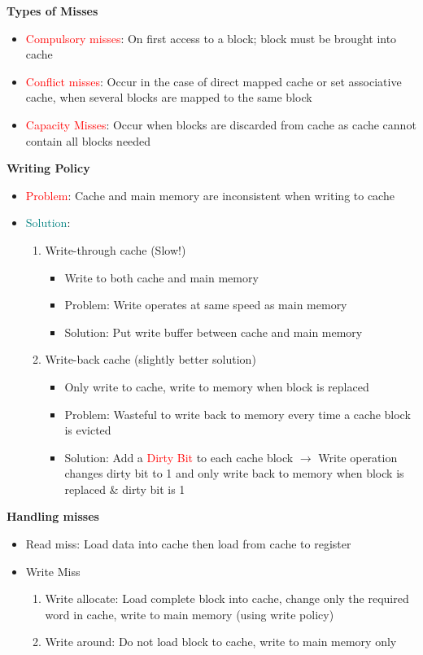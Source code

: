 \documentclass[a4paper]{article} \usepackage[backend=biber, style=numeric, sorting=none]{biblatex}
\begin{document}
\begin{multicols*}{4}
\textbf{{Types of Misses}}
\begin{itemize}
\item \textcolor{red}{Compulsory misses}: On first access to a block; block must be brought into cache
\item \textcolor{red}{Conflict misses}: Occur in the case of direct mapped cache or set associative cache, when several blocks are mapped to the same block
\item \textcolor{red}{Capacity Misses}: Occur when blocks are discarded from cache as cache cannot contain all blocks needed\\
\end{itemize}

\textbf{{Writing Policy}}
\begin{itemize}
\item \textcolor{red}{Problem}: Cache and main memory are inconsistent when writing to cache
\item \textcolor{teal}{Solution}:
\begin{enumerate}[leftmargin=*]
    \item Write-through cache (Slow!)
    \begin{itemize}
        \item Write to both cache and main memory
        \item Problem: Write operates at same speed as main memory
        \item Solution: Put write buffer between cache and main memory
    \end{itemize}
    \item Write-back cache (slightly better solution)
    \begin{itemize}
        \item Only write to cache, write to memory when block is replaced
        \item Problem: Wasteful to write back to memory every time a cache block is evicted
        \item Solution: Add a \textcolor{red}{Dirty Bit} to each cache block $\rightarrow$ Write operation changes dirty bit to 1 and only write back to memory when block is replaced \& dirty bit is 1\\
    \end{itemize}
\end{enumerate}
\end{itemize}

\textbf{Handling misses}
\begin{itemize}
    \item Read miss: Load data into cache then load from cache to register
    \item Write Miss
    \begin{enumerate}[leftmargin=*]
        \item Write allocate: Load complete block into cache, change only the required word in cache, write to main memory (using write policy)
        \item Write around: Do not load block to cache, write to main memory only\\
    \end{enumerate}
\end{itemize}


\end{multicols*}
\end{document}
